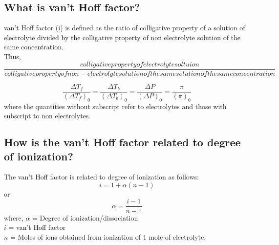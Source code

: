 \documentclass{article}
\begin{document}
   \subsection{What is van't Hoff factor?}
   van't Hoff factor (i) is defined as the ratio of colligative
   property of a solution of electrolyte divided by the colligative
   property of non electrolyte solution of the same concentration.\\
   Thus,
   \begin{equation}
   \frac{colligative property of electrolyte soltuion}
   {colligative property of non-electrolyte solution of the same
   solution of the same concentration}
   \end{equation}

   \begin{equation}
	   \frac{\Delta T_f}{(\Delta T_f)_0} = 
	   \frac{\Delta T_b}{(\Delta T_b )_0} = 
	   \frac{\Delta P} {(\Delta P)_0} =
	   \frac{\pi} {(\pi)_0}
   \end{equation}
   where the quantities without subscript refer to electrolytes and
   those with subscript to non electrolytes.

   \subsection{How is the van't Hoff factor related to degree of
   ionization?}
   The van't Hoff factor is related to degree of ionization as follows:
   \begin{equation} i = 1 + \alpha(n-1) \end{equation} or 
   \begin{equation} \alpha = \frac{i-1}{n-1} \end{equation}
   where, $\alpha$ = Degree of ionization/dissociation\\
   $i$ = van't Hoff factor\\
   $n$ = Moles of ions obtained from ionization of 1 mole of
   electrolyte.
\end{document}
